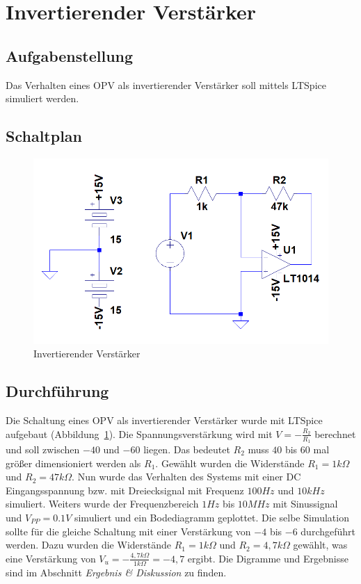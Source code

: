 \documentclass[12pt,a4paper,titlepage]{article}
\begin{document}
\section{Invertierender Verst\"arker}

\subsection{Aufgabenstellung}
Das Verhalten eines OPV als invertierender Verst\"arker soll mittels LTSpice simuliert werden.

\subsection{Schaltplan}
\begin{figure}[H]
  \centering
  \includegraphics{invertierend_schaltung}
  \caption{Invertierender Verst\"arker}
  \label{figure11}
\end{figure}

\subsection{Durchf\"uhrung}
\noindent Die Schaltung eines OPV als invertierender Verst\"arker wurde mit LTSpice aufgebaut (Abbildung~\ref{figure11}). Die Spannungsverst\"arkung wird mit $V = -\frac{R_2}{R_1}$ berechnet und soll zwischen $-40$ und $-60$ liegen. Das bedeutet $R_2$ muss $40$ bis $60$ mal gr\"o\ss er dimensioniert werden als $R_1$. Gew\"ahlt wurden die Widerst\"ande $R_1 = 1k\Omega$ und $R_2 = 47k\Omega$. Nun wurde das Verhalten des Systems mit einer DC Eingangsspannung bzw. mit Dreiecksignal mit Frequenz $100Hz$ und $10kHz$ simuliert. Weiters wurde der Frequenzbereich $1Hz$ bis $10MHz$ mit Sinussignal und $V_{PP} = 0.1V$ simuliert und ein Bodediagramm geplottet. Die selbe Simulation sollte f\"ur die gleiche Schaltung mit einer Verst\"arkung von $-4$ bis $-6$ durchgef\"uhrt werden. Dazu wurden die Widerst\"ande $R_1 = 1k\Omega$ und $R_2 = 4,7k\Omega$ gew\"ahlt, was eine Verst\"arkung von $V_u = -\frac{4,7k\Omega}{1k\Omega} = -4,7$ ergibt. Die Digramme und Ergebnisse sind im Abschnitt \textit{Ergebnis \& Diskussion} zu finden. \\
\end{document}
